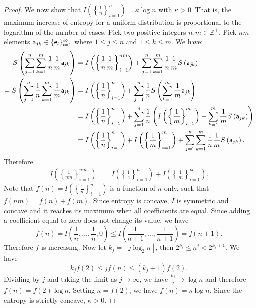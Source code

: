 \begin{mathSection}
\begin{proof}
	We now show that $I\left(\left\{\frac{1}{n}\right\}_{i=1}^{n}\right) = \kappa \log n$ with $\kappa > 0$. That is, the maximum increase of entropy for a uniform distribution is proportional to the logarithm of the number of cases. Pick two positive integers $n, m \in \mathbb{Z}^+$. Pick $nm$ elements $\ens[a]_{jk} \in \{\ens_l\}_{l=1}^{\infty}$ where $1\leq j \leq n$ and $1 \leq  k \leq m$. We have:
	\begin{equation}
		\begin{aligned}
			S\left(\sum_{j=1}^{n}\sum_{k=1}^{m} \frac{1}{n}\frac{1}{m} \ens[a]_{jk}\right) &= I\left(\left\{ \frac{1}{n}\frac{1}{m}\right\}_{i=1}^{nm}\right) + \sum_{j=1}^{n}\sum_{k=1}^{m} \frac{1}{n}\frac{1}{m} S\left(\ens[a]_{jk}\right) \\
			= S\left(\sum_{j=1}^{n} \frac{1}{n} \sum_{k=1}^{m} \frac{1}{m} \ens[a]_{jk}\right)  &=I\left(\left\{ \frac{1}{n}\right\}_{i=1}^{n}\right) + \sum_{j=1}^{n} \frac{1}{n} S\left(\sum_{k=1}^{m}\frac{1}{m}\ens[a]_{jk}\right) \\
			&=I\left(\left\{ \frac{1}{n}\right\}_{i=1}^{n}\right) + \sum_{j=1}^{n} \frac{1}{n}\left(I\left(\left\{ \frac{1}{m}\right\}_{i=1}^{m}\right) +  \sum_{k=1}^{m}\frac{1}{m}S\left(\ens[a]_{jk}\right)\right) \\
			&=I\left(\left\{ \frac{1}{n}\right\}_{i=1}^{n}\right) + I\left(\left\{ \frac{1}{m}\right\}_{i=1}^{m}\right) + \sum_{j=1}^{n} \sum_{k=1}^{m}\frac{1}{n}\frac{1}{m}S\left(\ens[a]_{jk}\right).
		\end{aligned}
	\end{equation}
	Therefore
	\begin{equation}
		\begin{aligned}
			I\left(\left\{ \frac{1}{nm}\right\}_{i=1}^{nm}\right) &=I\left(\left\{ \frac{1}{n}\right\}_{i=1}^{n}\right) + I\left(\left\{ \frac{1}{m}\right\}_{i=1}^{m}\right).
		\end{aligned}
	\end{equation}
	Note that $f(n) = I\left(\left\{ \frac{1}{n}\right\}_{i=1}^{n}\right)$ is a function of $n$ only, such that $f(nm) = f(n) + f(m)$. Since entropy is concave, $I$ is symmetric and concave and it reaches its maximum when all coefficients are equal. Since adding a coefficient equal to zero does not change its value, we have
	\begin{equation}
		f(n)=I\left(\frac{1}{n},\ldots,\frac{1}{n},0\right)
		\leq I\left(\frac{1}{n+1},\ldots,\frac{1}{n+1}\right)=f(n+1).
	\end{equation}
	Therefore $f$ is increasing. Now let $k_j=\left\lfloor j\log_2 n\right\rfloor$, then $2^{k_j}\leq n^j<2^{k_j+1}$. We have
	\begin{equation}
		k_j f(2)\leq j f(n)\leq(k_j+1)f(2).
	\end{equation}
	Dividing by $j$ and taking the limit as $j\to\infty$, we have $\frac{k_j}{j}\to\log n$ and therefore $f(n)=f(2)\log n$. Setting $\kappa=f(2)$, we have $f(n)=\kappa\log n$. Since the entropy is strictly concave, $\kappa>0$.
	

\end{proof}
\end{mathSection}
